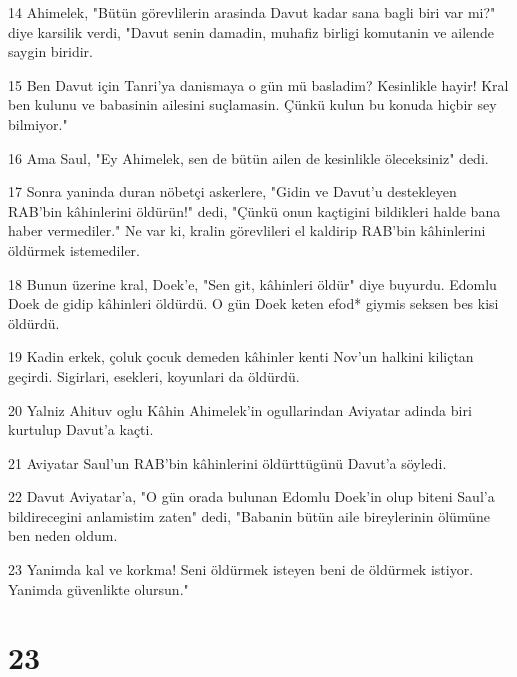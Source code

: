 \par 14 Ahimelek, "Bütün görevlilerin arasinda Davut kadar sana bagli biri var mi?" diye karsilik verdi, "Davut senin damadin, muhafiz birligi komutanin ve ailende saygin biridir.
\par 15 Ben Davut için Tanri'ya danismaya o gün mü basladim? Kesinlikle hayir! Kral ben kulunu ve babasinin ailesini suçlamasin. Çünkü kulun bu konuda hiçbir sey bilmiyor."
\par 16 Ama Saul, "Ey Ahimelek, sen de bütün ailen de kesinlikle öleceksiniz" dedi.
\par 17 Sonra yaninda duran nöbetçi askerlere, "Gidin ve Davut'u destekleyen RAB'bin kâhinlerini öldürün!" dedi, "Çünkü onun kaçtigini bildikleri halde bana haber vermediler." Ne var ki, kralin görevlileri el kaldirip RAB'bin kâhinlerini öldürmek istemediler.
\par 18 Bunun üzerine kral, Doek'e, "Sen git, kâhinleri öldür" diye buyurdu. Edomlu Doek de gidip kâhinleri öldürdü. O gün Doek keten efod* giymis seksen bes kisi öldürdü.
\par 19 Kadin erkek, çoluk çocuk demeden kâhinler kenti Nov'un halkini kiliçtan geçirdi. Sigirlari, esekleri, koyunlari da öldürdü.
\par 20 Yalniz Ahituv oglu Kâhin Ahimelek'in ogullarindan Aviyatar adinda biri kurtulup Davut'a kaçti.
\par 21 Aviyatar Saul'un RAB'bin kâhinlerini öldürttügünü Davut'a söyledi.
\par 22 Davut Aviyatar'a, "O gün orada bulunan Edomlu Doek'in olup biteni Saul'a bildirecegini anlamistim zaten" dedi, "Babanin bütün aile bireylerinin ölümüne ben neden oldum.
\par 23 Yanimda kal ve korkma! Seni öldürmek isteyen beni de öldürmek istiyor. Yanimda güvenlikte olursun."

\chapter{23}

